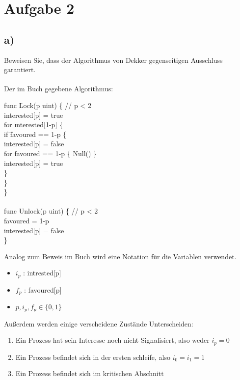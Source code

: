 \section*{Aufgabe 2}


\subsection*{ a) }

Beweisen Sie, dass der Algorithmus von Dekker gegenseitigen Ausschluss garantiert.
\\
\\
Der im Buch gegebene Algorithmus:

\begin{mylisting}
\begin{tabbing}

func \=Lock(p uint) \{ // p < 2 \\
\>	interested[p] = true \\
\>	for \= interested[1-p] \{ \\
\>	\>	if \= favoured == 1-p \{ \\
\>	\>	\>	interested[p] = false \\
\>	\>	\>	for favoured == 1-p \{ Null() \} \\
\>	\>	\>	interested[p] = true \\
\>	\>	\} \\
\>	\} \\
\} \\
\\
func Unlock(p uint) \{ // p < 2 \\
\>	favoured = 1-p \\
\>	interested[p] = false \\
\} \\
\end{tabbing} 
\end{mylisting} 

Analog zum Beweis im Buch wird eine Notation für die Variablen verwendet.

\begin{itemize}
	\item[] $ i_{p}$ :  intrested[p] 
	\item[] $ f_{p}$ :  favoured[p]  
	\item[] $ p , i_{p} , f_{p} \in \{ 0,1 \} $
\end{itemize} 

Außerdem werden einige verscheidene Zustände Unterscheiden:

\begin{enumerate}
	\item Ein Prozess hat sein Interesse noch nicht Signalisiert, also weder $ i_{p} = 0$ 
	\item Ein Prozess befindet sich in der ersten schleife, also $ i_{0} = i_{1} = 1$
	\item Ein Prozess befindet sich im kritischen Abschnitt
\end{enumerate}

